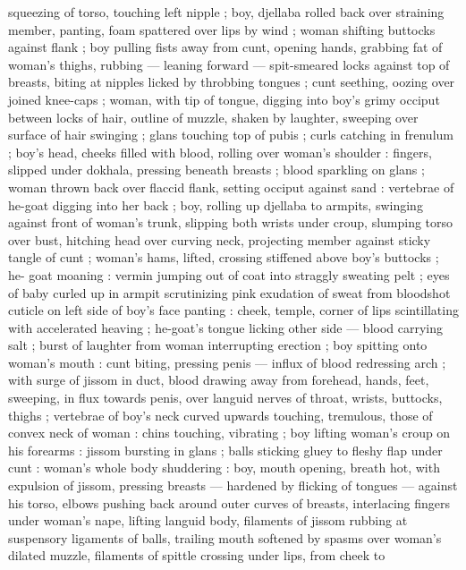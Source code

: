 squeezing of torso, touching left nipple ; boy, djellaba rolled back 
over straining member, panting, foam spattered over lips by wind ; 
woman shifting buttocks against flank ; boy pulling fists away from 
cunt, opening hands, grabbing fat of woman's thighs, rubbing --- 
leaning forward --- spit-smeared locks against top of breasts, biting 
at nipples licked by throbbing tongues ; cunt seething, oozing over 
joined knee-caps ; woman, with tip of tongue, digging into boy's 
grimy occiput between locks of hair, outline of muzzle, shaken by 
laughter, sweeping over surface of hair swinging ; glans touching top 
of pubis ; curls catching in frenulum ; boy's head, cheeks filled with 
blood, rolling over woman's shoulder : fingers, slipped under 
dokhala, pressing beneath breasts ; blood sparkling on glans ; 
woman thrown back over flaccid flank, setting occiput against sand : 
vertebrae of he-goat digging into her back ; boy, rolling up djellaba 
to armpits, swinging against front of woman's trunk, slipping both 
wrists under croup, slumping torso over bust, hitching head over 
curving neck, projecting member against sticky tangle of cunt ; 
woman's hams, lifted, crossing stiffened above boy's buttocks ; he- 
goat moaning : vermin jumping out of coat into straggly sweating 
pelt ; eyes of baby curled up in armpit scrutinizing pink exudation of 
sweat from bloodshot cuticle on left side of boy's face panting : 
cheek, temple, corner of lips scintillating with accelerated heaving ; 
he-goat's tongue licking other side --- blood carrying salt ; burst of 
laughter from woman interrupting erection ; boy spitting onto 
woman's mouth : cunt biting, pressing penis --- influx of blood 
redressing arch ; with surge of jissom in duct, blood drawing away 
from forehead, hands, feet, sweeping, in flux towards penis, over 
languid nerves of throat, wrists, buttocks, thighs ; vertebrae of boy's 
neck curved upwards touching, tremulous, those of convex neck of 
woman : chins touching, vibrating ; boy lifting woman's croup on his 
forearms : jissom bursting in glans ; balls sticking gluey to fleshy flap 
under cunt : woman's whole body shuddering : boy, mouth opening, 
breath hot, with expulsion of jissom, pressing breasts --- hardened 
by flicking of tongues --- against his torso, elbows pushing back 
around outer curves of breasts, interlacing fingers under woman's 
nape, lifting languid body, filaments of jissom rubbing at suspensory 
ligaments of balls, trailing mouth softened by spasms over woman's 
dilated muzzle, filaments of spittle crossing under lips, from cheek to 
